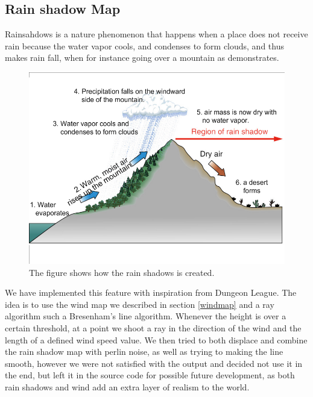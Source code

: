\subsection{Rain shadow Map}
\label{rainshadowmap}

Rainsahdows is a nature phenomenon that happens when a place does not receive rain because the water vapor cools, and condenses to form clouds, and thus makes rain fall, when for instance going over a mountain as  demonstrates.

\begin{figure}[H]
	\includegraphics[width=1\linewidth]{img/Rainshadow}
	\centering
	\caption{The figure shows how the rain shadows is created.}
	\label{fig:Rainshadow}
\end{figure}

We have implemented this feature with inspiration from Dungeon League\cite{RainShadowMap}. The idea is to use the wind map we described in section \ref{windmap} and a ray algorithm such a Bresenham's line algorithm\cite{Bresenham}. Whenever the height is over a certain threshold, at a point we shoot a ray in the direction of the wind and the length of a defined wind speed value. We then tried to both displace and combine the rain shadow map with perlin noise, as well as trying to making the line smooth, however we were not satisfied with the output and decided not use it in the end, but left it in the source code for possible future development, as both rain shadows and wind add an extra layer of realism to the world.